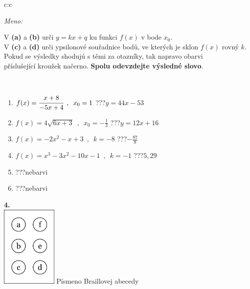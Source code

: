 \documentclass[10pt]{report}
\begin{document}
\begin{tabular}{c:c}
\begin{minipage}[c][104.5mm][t]{0.5\linewidth}
\begin{center}
\textit{Meno:}\phantom{xxxxxxxxxxxxxxxxxxxxxxxxxxxxxxxxxxxxxxxxxxxxxxxxxxxxxxxxxxxxxxxxx}\\[5mm]
\begin{minipage}{0.95\linewidth}
\begin{center}
V \textbf{(a)} a \textbf{(b)} urči  $y = kx + q$ ku funkci $f(x)$ v bode $x_0$.\\V \textbf{(c)} a \textbf{(d)} urči ypsilonové souřadnice bodů, ve kterých je sklon $f(x)$ rovný $k$.\\Pokud se výsledky shodujú s těmi za otazníky, tak napravo obarvi\\příslušející kroužek načerno. \textbf{Spolu odevzdejte výsledné slovo}.
\end{center}
\end{minipage}
\\[1mm]
\begin{minipage}{0.79\linewidth}
\begin{center}
\begin{varwidth}{\linewidth}
\begin{enumerate}
\small
\item $f(x)=\cfrac{x+8}{-5x+4}\enspace , \enspace x_0=1$\quad \dotfill\; ???\;\dotfill \quad $y = 44x-53$
\item $f(x)=4\sqrt{6x+3}\enspace , \enspace x_0=-\frac{1}{3}$\quad \dotfill\; ???\;\dotfill \quad $y = 12x+16$
\item $f(x)=-2x^2-x+3\enspace , \enspace k=-8$\quad \dotfill\; ???\;\dotfill \quad $-\frac{87}{8}$
\item $f(x)=x^3-3x^2-10x-1\enspace , \enspace k=-1$\quad \dotfill\; ???\;\dotfill \quad $5 , 29$
\item \quad \dotfill\; ???\;\dotfill \quad nebarvi
\item \quad \dotfill\; ???\;\dotfill \quad nebarvi
\end{enumerate}
\end{varwidth}
\end{center}
\end{minipage}
\begin{minipage}{0.20\linewidth}
\begin{center}
{\Huge\bfseries 4.} \\[2mm]
\includegraphics[height=40mm]{../images/braille.png}
{\small Písmeno Braillovej abecedy}
\end{center}
\end{minipage}
\end{center}
\end{minipage}
%
\end{tabular}
\end{document}
